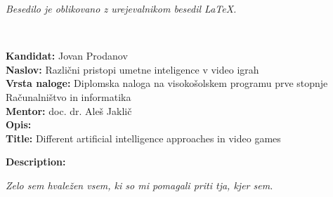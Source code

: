 \documentclass[a4paper, 12pt]{book}
\newcommand{\ttitle}{Različni pristopi umetne inteligence v video igrah}
\newcommand{\ttitleEn}{Different artificial intelligence approaches in video games}
\newcommand{\tauthor}{Jovan Prodanov}
\newcommand{\clearemptydoublepage}{\newpage{\pagestyle{empty}\cleardoublepage}}
\begin{document}
\begin{center}
\mbox{}\vfill
\emph{Besedilo je oblikovano z urejevalnikom besedil \LaTeX.}
\end{center}

\clearemptydoublepage

\thispagestyle{empty}
\
\vfill

\bigskip
\noindent\textbf{Kandidat:} \tauthor\\
\noindent\textbf{Naslov:} \ttitle\\
\noindent\textbf{Vrsta naloge:} Diplomska naloga na visokošolskem programu prve stopnje Računalništvo in informatika \\
\noindent\textbf{Mentor:} doc. dr. Aleš Jaklič\\

\bigskip
\noindent\textbf{Opis:}\\

\bigskip
\noindent\textbf{Title:} \ttitleEn

\bigskip
\noindent\textbf{Description:}\\


\vfill

\vspace{2cm}

\clearemptydoublepage

\thispagestyle{empty}\mbox{}\vfill\null\it%
\noindent
Zelo sem hvaležen vsem, ki so mi pomagali priti tja, kjer sem.
\rm\normalfont

\clearemptydoublepage





\pagestyle{empty}
\def\thepage{}%
\tableofcontents{}


\clearemptydoublepage


\end{document}

